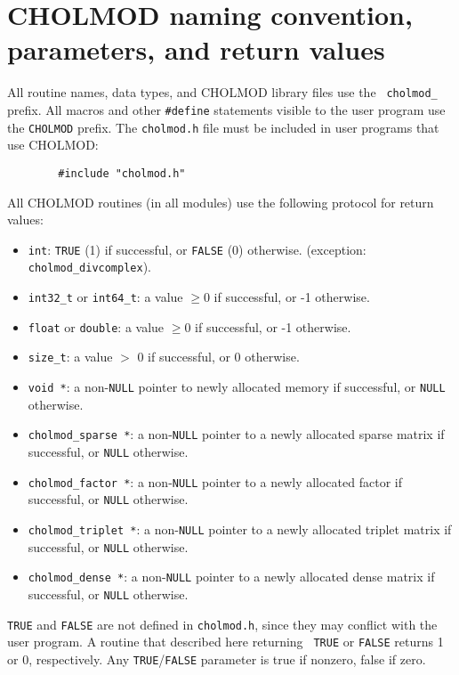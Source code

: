 \documentclass[11pt]{article}
\begin{document}
\newpage \section{CHOLMOD naming convention, parameters, and return values}

All routine names, data types, and CHOLMOD library files use the {\tt
cholmod\_} prefix.  All macros and other {\tt \#define} statements visible to
the user program use the {\tt CHOLMOD} prefix.  The {\tt cholmod.h} file must
be included in user programs that use CHOLMOD:

{\footnotesize
\begin{verbatim}
        #include "cholmod.h"
\end{verbatim}
}

\noindent
All CHOLMOD routines (in all modules) use the following protocol for return values:
\begin{itemize}
\item {\tt int}: {\tt TRUE} (1) if successful, or {\tt FALSE} (0) otherwise.
(exception: {\tt cholmod\_divcomplex}).
\item {\tt int32\_t} or {\tt int64\_t}:
    a value $\ge 0$ if successful, or -1 otherwise.
\item {\tt float} or {\tt double}:
    a value $\ge 0$ if successful, or -1 otherwise.
\item {\tt size\_t}: a value $>$ 0 if successful, or 0 otherwise.
\item {\tt void *}: a non-{\tt NULL} pointer to newly allocated memory if
    successful, or {\tt NULL} otherwise.
\item {\tt cholmod\_sparse *}:  a non-{\tt NULL} pointer to a newly allocated
    sparse matrix if successful, or {\tt NULL} otherwise.
\item {\tt cholmod\_factor *}:  a non-{\tt NULL} pointer to a newly allocated
    factor if successful, or {\tt NULL} otherwise.
\item {\tt cholmod\_triplet *}: a non-{\tt NULL} pointer to a newly allocated
    triplet matrix if successful, or {\tt NULL} otherwise.
\item {\tt cholmod\_dense *}:   a non-{\tt NULL} pointer to a newly allocated
    dense matrix if successful, or {\tt NULL} otherwise.
\end{itemize}

{\tt TRUE} and {\tt FALSE} are not defined in {\tt cholmod.h}, since they may
conflict with the user program.  A routine that described here returning {\tt
TRUE} or {\tt FALSE} returns 1 or 0, respectively.  Any {\tt TRUE}/{\tt FALSE}
parameter is true if nonzero, false if zero.
\end{document}
